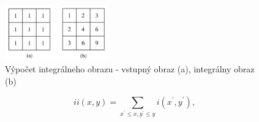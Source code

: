 \documentclass[slovak,master,dept460,male,cpp,cpdeclaration]{diploma}
\begin{document}
\begin{figure}[H]
	\centering
	\includegraphics[width=0.4\textwidth]{Figures/integralImage.png}
	\caption{Výpočet integrálneho obrazu - vstupný obraz (a), integrálny obraz (b)}
	\label{fig:integralImage}
\end{figure}


\begin{equation}
ii(x,y)=\sum_{x^{\prime}\leq x,y^{\prime}\leq y}i(x^{\prime},y^{\prime}),
\label{eq:integral}
\end{equation}
\end{document}
